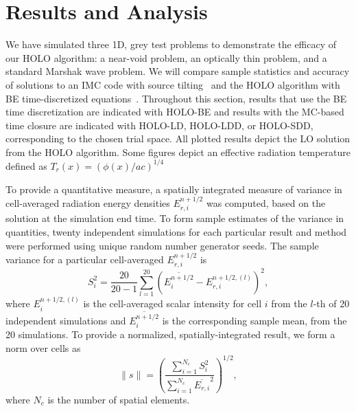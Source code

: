 \documentclass{anstrans}
\renewcommand{\ss}{\ensuremath{\|s\|}}
\begin{document}
\section{Results and Analysis}

We have simulated three 1D, grey test problems to demonstrate the efficacy of our HOLO
algorithm: a near-void problem, an optically thin problem, and a standard Marshak wave problem.
We will compare sample statistics and accuracy of solutions to an IMC code with
source tilting~\cite{jayenne} and the HOLO algorithm with BE time-discretized
equations~\cite{nse_bolding}. Throughout this section, results that use the
BE time discretization are indicated with HOLO-BE and results with the MC-based time
closure are indicated with HOLO-LD, HOLO-LDD, or HOLO-SDD, corresponding to the chosen trial space. 
All plotted results depict the LO solution from the HOLO algorithm.  Some figures depict an
effective radiation temperature defined as $T_{r}(x) = \left(\phi(x)/ac\right)^{1/4}$

To provide a quantitative measure, a spatially integrated measure of variance in cell-averaged radiation energy
densities $E_{r,i}^{n+1/2}$ was computed, based on the solution at the simulation end time.
To form sample estimates of the variance in quantities, twenty independent simulations for each
particular result and method were performed using unique random number generator seeds.
The sample variance for a particular cell-averaged $E_{r,i}^{n+1/2}$ is 
\begin{equation} 
    S_i^2 =  \frac{20}{20-1} \sum_{l=1}^{20} \left(\overline{E^{n+1/2}_{i}} -
    E_{r,i}^{n+1/2,(l)}\right)^2,
\end{equation}
where $E_{i}^{n+1/2,(l)}$ is the cell-averaged scalar intensity for cell $i$ from the $l$-th of 20 independent simulations and
$\overline{E^{n+1/2}_{i}}$ is the corresponding sample mean, from the 20 simulations. To
provide a normalized, spatially-integrated result, we form a norm over cells as 
\begin{equation}
    \ss = \left({\frac{\sum\limits_{i=1}^{N_c}
S_i^2}{\sum\limits_{i=1}^{N_c}\overline{E_{r,i}}^2}}\right)^{1/2},
\end{equation}
where $N_c$ is the number of spatial elements.
\end{document}
